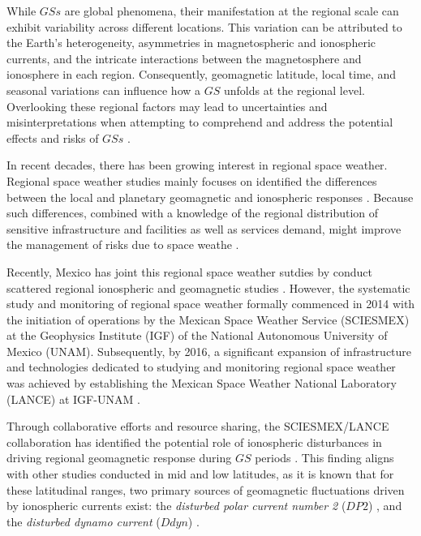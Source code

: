 \documentclass[a4paper,fleqn]{cas-dc}
\begin{document}
While $GSs$ are global phenomena, their manifestation at the regional scale can exhibit variability across different locations. This variation can be attributed to the Earth's heterogeneity, asymmetries in magnetospheric and ionospheric currents, and the intricate interactions between the magnetosphere and ionosphere in each region. Consequently, geomagnetic latitude, local time, and seasonal variations can influence how a $GS$ unfolds at the regional level. Overlooking these regional factors may lead to uncertainties and misinterpretations when attempting to comprehend and address the potential effects and risks of $GSs$ \citep{gic_intro, gic, gic_2, gic_brazil}.

In recent decades, there has been growing interest in regional space weather. Regional space weather studies mainly focuses on identified the differences between the local and planetary geomagnetic and ionospheric responses \citep[see][and references there in]{gic_czech, gic_brazil,gic}. Because such differences, combined with a knowledge of the regional distribution of sensitive infrastructure and facilities as well as services demand, might improve the management of risks due to space weathe \citep{schrijver2015}.

Recently, Mexico has joint this regional space weather sutdies by conduct scattered regional ionospheric and geomagnetic studies \citep[\emph{e.g.}][]{MEXART2003, MEXART2005, MEXART_iono_dist, MEXART_iono_dist2, mario_rodriguez2011, lopez-montes, mario_rodriguez2014, iono-resp2016, lenica}. However, the systematic study and monitoring of regional space weather formally commenced in 2014 with the initiation of operations by the Mexican Space Weather Service (SCIESMEX) at the Geophysics Institute (IGF) of the National Autonomous University of Mexico (UNAM). Subsequently, by 2016, a significant expansion of infrastructure and technologies dedicated to studying and monitoring regional space weather was achieved by establishing the Mexican Space Weather National Laboratory (LANCE) at IGF-UNAM \citep{sciesmex_art}.

Through collaborative efforts and resource sharing, the SCIESMEX/LANCE collaboration has identified the potential role of ionospheric disturbances in driving regional geomagnetic response during $GS$ periods \citep[see][]{esmeralda, dramaria_1, dramaria7, P-corona1, P-corona2}. This finding aligns with other studies conducted in mid and low latitudes, as it is known that for these latitudinal ranges, two primary sources of geomagnetic fluctuations driven by ionospheric currents exist: the \emph{disturbed polar current number 2} ($DP2$) \citep{nishida_68_coherence, nishida_68_fluctuations, nishida_66_knee}, and the \emph{disturbed dynamo current} ($Ddyn$) \citep{blanc_ddyn}.
\end{document}
